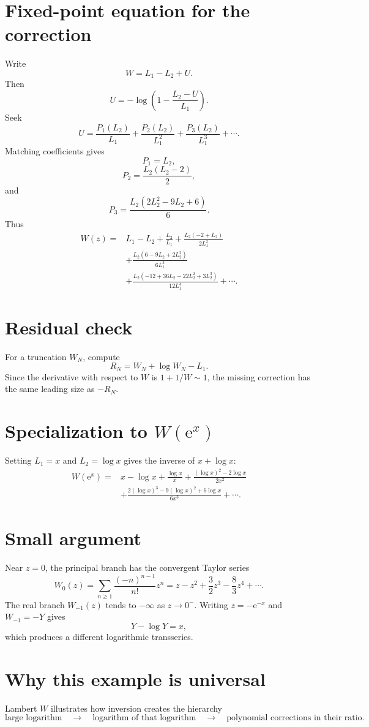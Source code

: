 \documentclass[11pt,oneside,openany]{book}
\newcommand{\e}{\mathrm{e}}
\theoremstyle{plain}
\theoremstyle{definition}
\theoremstyle{remark}
\begin{document}
\section{Fixed-point equation for the correction}
Write
\[
  W=L_1-L_2+U.
\]
Then
\[
  U=-\log\left(1-\frac{L_2-U}{L_1}\right).
\]
Seek
\[
  U=\frac{P_1(L_2)}{L_1}
  +\frac{P_2(L_2)}{L_1^2}
  +\frac{P_3(L_2)}{L_1^3}+\cdots.
\]
Matching coefficients gives
\[
  P_1=L_2,
\]
\[
  P_2=\frac{L_2(L_2-2)}2,
\]
and
\[
  P_3=\frac{L_2(2L_2^2-9L_2+6)}6.
\]
Thus
\[
\boxed{
\begin{aligned}
W(z)={}&L_1-L_2+\frac{L_2}{L_1}
 +\frac{L_2(-2+L_2)}{2L_1^2}\\
&+\frac{L_2(6-9L_2+2L_2^2)}{6L_1^3}\\
&+\frac{L_2(-12+36L_2-22L_2^2+3L_2^3)}{12L_1^4}
+\cdots.
\end{aligned}}
\]

\section{Residual check}
For a truncation $W_N$, compute
\[
  R_N=W_N+\log W_N-L_1.
\]
Since the derivative with respect to $W$ is $1+1/W\sim1$, the missing correction has the same leading size as $-R_N$.

\section{Specialization to \texorpdfstring{$W(\e^x)$}{W(exp x)}}
Setting $L_1=x$ and $L_2=\log x$ gives the inverse of $x+\log x$:
\[
\begin{aligned}
W(\e^x)={}&x-\log x+\frac{\log x}{x}
 +\frac{(\log x)^2-2\log x}{2x^2}\\
&+\frac{2(\log x)^3-9(\log x)^2+6\log x}{6x^3}+\cdots.
\end{aligned}
\]

\section{Small argument}
Near $z=0$, the principal branch has the convergent Taylor series
\[
  W_0(z)=\sum_{n\ge1}\frac{(-n)^{n-1}}{n!}z^n
  =z-z^2+\frac32z^3-\frac83z^4+\cdots.
\]
The real branch $W_{-1}(z)$ tends to $-\infty$ as $z\to0^-$. Writing $z=-\e^{-x}$ and $W_{-1}=-Y$ gives
\[
  Y-\log Y=x,
\]
which produces a different logarithmic transseries.

\section{Why this example is universal}
Lambert $W$ illustrates how inversion creates the hierarchy
\[
  \text{large logarithm}
  \quad\to\quad
  \text{logarithm of that logarithm}
  \quad\to\quad
  \text{polynomial corrections in their ratio}.
\]
\end{document}
